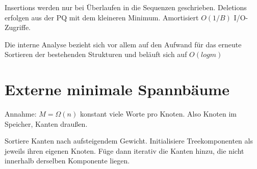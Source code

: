 Insertions werden nur bei Überlaufen in die Sequenzen geschrieben.
Deletions erfolgen aus der PQ mit dem kleineren Minimum.
Amortisiert $O(1/B)$ I/O-Zugriffe.

Die interne Analyse bezieht sich vor allem auf den Aufwand für das erneute Sortieren der bestehenden Strukturen und beläuft sich auf $O(log m)$ 

\section{Externe minimale Spannbäume}
Annahme: $M=\Omega(n)$ konstant viele Worte pro Knoten. Also Knoten im Speicher, Kanten draußen.

Sortiere Kanten nach aufsteigendem Gewicht. Initialisiere Treekomponenten als jeweils ihren eigenen Knoten. Füge dann iterativ die Kanten hinzu, die nicht innerhalb derselben Komponente liegen.
